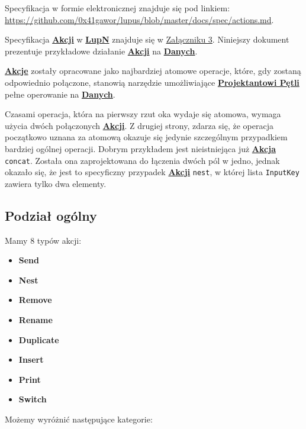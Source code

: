 \label{appendix:6}

Specyfikacja w formie elektronicznej znajduje się pod linkiem: \url{https://github.com/0x41gawor/lupus/blob/master/docs/spec/actions.md}.

Specyfikacja \hyperlink{def:akcja}{\textbf{Akcji}} w \hyperlink{def:lupn}{\textbf{LupN}} znajduje się w \hyperref[appendix:3]{Załączniku 3}. Niniejszy dokument prezentuje przykładowe działanie \hyperlink{def:akcja}{\textbf{Akcji}} na \hyperlink{def:dane}{\textbf{Danych}}.

\hyperlink{def:akcja}{\textbf{Akcje}} zostały opracowane jako najbardziej atomowe operacje, które, gdy zostaną odpowiednio połączone, stanowią narzędzie umożliwiające \hyperlink{def:projektant}{\textbf{Projektantowi Pętli}} pełne operowanie na \hyperlink{def:dane}{\textbf{Danych}}.

Czasami operacja, która na pierwszy rzut oka wydaje się atomowa, wymaga użycia dwóch połączonych \hyperlink{def:akcja}{\textbf{Akcji}}. Z drugiej strony, zdarza się, że operacja początkowo uznana za atomową okazuje się jedynie szczególnym przypadkiem bardziej ogólnej operacji. Dobrym przykładem jest nieistniejąca już \hyperlink{def:akcja}{\textbf{Akcja}} \texttt{concat}. Została ona zaprojektowana do łączenia dwóch pól w jedno, jednak okazało się, że jest to specyficzny przypadek \hyperlink{def:akcja}{\textbf{Akcji}} \texttt{nest}, w której lista \texttt{InputKey} zawiera tylko dwa elementy.

\subsection{Podział ogólny}

Mamy 8 typów akcji:

\begin{itemize}
    \item \textbf{Send}
    \item \textbf{Nest}
    \item \textbf{Remove}
    \item \textbf{Rename}
    \item \textbf{Duplicate}
    \item \textbf{Insert}
    \item \textbf{Print}
    \item \textbf{Switch}
\end{itemize}

Możemy wyróżnić następujące kategorie:

